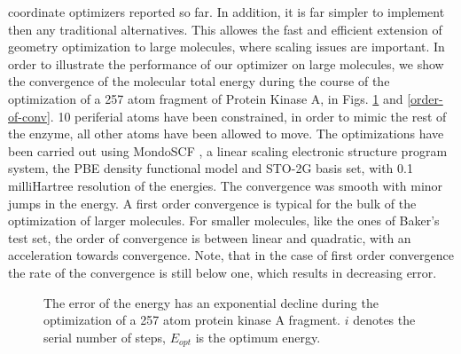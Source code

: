 \documentclass[prl,aps,twocolumn,showpacs,twocolumngrid,superbib]{revtex4}
\begin{document}
coordinate optimizers reported so far. In addition, it is far simpler
to implement then any traditional alternatives.
This allowes the fast and efficient 
extension of geometry optimization 
to large molecules, where scaling issues are important.
In order to illustrate the performance of our optimizer on large
molecules, we show the convergence of the molecular total energy
during the course of the optimization of a 257 atom
fragment of Protein Kinase A, in Figs. \ref{logn-logde} 
and \ref{order-of-conv}. 10 periferial atoms have been 
constrained, in order to mimic the rest of the enzyme, 
all other atoms have been allowed to move.
The optimizations have been carried out 
using MondoSCF \cite{MondoSCF}, a linear scaling electronic structure
program system, the PBE density functional model and 
STO-2G basis set, with 0.1 milliHartree resolution of the energies.
The convergence was smooth with minor jumps in the energy.
A first order convergence is typical for the bulk of the optimization
of larger molecules. For smaller molecules, like the ones of Baker's
test set, the order of convergence is between linear and quadratic,
with an acceleration towards convergence. Note, that in the case
of first order convergence the rate of the convergence is still
below one, which results in decreasing error.
\begin{figure}[h]
\caption{
\small  
The error of the energy has an exponential decline during
the optimization of a 257 atom protein kinase A fragment. 
$i$ denotes the serial number of steps,
$E_{opt}$ is the optimum energy.
\label{logn-logde}
}
\end{figure}
%
%
%
%
\end{document}
